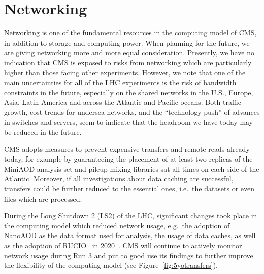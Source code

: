 \documentclass{cmspaper}
\begin{document}
\section{Networking}
\label{sec:risks_from_networking}
Networking is one of the fundamental resources in the computing model of CMS, in addition to storage and computing power. When planning for the future, we are giving networking more and more equal consideration. Presently, we have no indication that CMS is exposed to risks from networking which are particularly higher than those facing other experiments. 
However, we note that one of the main uncertainties for all of the LHC experiments is the risk of bandwidth constraints in the future, especially on the shared networks in the U.S., Europe, Asia, Latin America and across the Atlantic and Pacific oceans.
Both traffic growth, cost trends for undersea networks, and the ``technology push'' of advances in switches and servers, seem to indicate that the headroom we have today may be reduced in the future.

CMS adopts measures to prevent expensive transfers and remote reads already today, for example by guaranteeing the placement of at least two replicas of the MiniAOD analysis set and pileup mixing libraries sat all times on each side of the Atlantic.
Moreover, if all investigations about data caching are successful, transfers could be further reduced to the essential ones, i.e.~the datasets or even files which are processed. 


During the Long Shutdown 2 (LS2) of the LHC, significant changes took place in the computing model which reduced network usage, e.g.~the adoption of NanoAOD as the data format used for analysis, the usage of data caches, as well as the adoption of RUCIO~\cite{Rucio2019} in 2020~\cite{Vaandering:2757339}. CMS will continue to actively monitor network usage during Run 3 and put to good use its findings to further improve the flexibility of the computing model (see Figure~\ref{fig:5yotransfers}).
\end{document}
